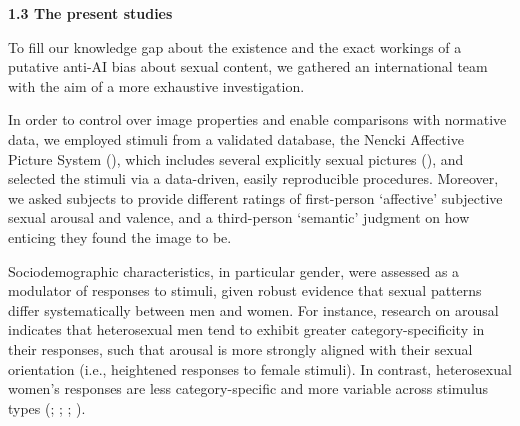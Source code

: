 \documentclass[
  jou,
  floatsintext,
  longtable,
  nolmodern,
  notxfonts,
  notimes,
  colorlinks=true,linkcolor=blue,citecolor=blue,urlcolor=blue]{apa7}
\begin{document}
\textbf{1.3 The present studies}

To fill our knowledge gap about the existence and the exact workings of
a putative anti-AI bias about sexual content, we gathered an
international team with the aim of a more exhaustive investigation.

In order to control over image properties and enable comparisons with
normative data, we employed stimuli from a validated database, the
Nencki Affective Picture System
(), which
includes several explicitly sexual pictures
(), and selected
the stimuli via a data-driven, easily reproducible procedures. Moreover,
we asked subjects to provide different ratings of first-person
`affective' subjective sexual arousal and valence, and a third-person
`semantic' judgment on how enticing they found the image to be.

Sociodemographic characteristics, in particular gender, were assessed as
a modulator of responses to stimuli, given robust evidence that sexual
patterns differ systematically between men and women. For instance,
research on arousal indicates that heterosexual men tend to exhibit
greater category-specificity in their responses, such that arousal is
more strongly aligned with their sexual orientation (i.e., heightened
responses to female stimuli). In contrast, heterosexual women's
responses are less category-specific and more variable across stimulus
types (;
;
;
).
\end{document}
